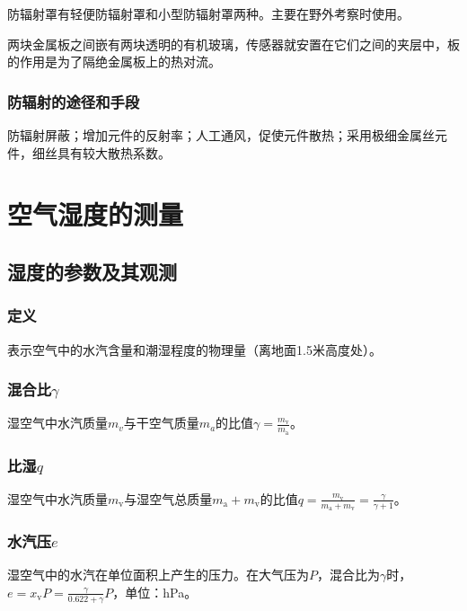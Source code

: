 \documentclass[UTF8,11pt]{ctexbook}
\begin{document}
防辐射罩有轻便防辐射罩和小型防辐射罩两种。主要在野外考察时使用。

两块金属板之间嵌有两块透明的有机玻璃，传感器就安置在它们之间的夹层中，板的作用是为了隔绝金属板上的热对流。

\subsection{防辐射的途径和手段}

防辐射屏蔽；增加元件的反射率；人工通风，促使元件散热；采用极细金属丝元件，细丝具有较大散热系数。

\chapter{空气湿度的测量}

\section{湿度的参数及其观测}

\subsection{定义}

表示空气中的水汽含量和潮湿程度的物理量（离地面1.5米高度处）。

\subsection{混合比\(\gamma\)}

湿空气中水汽质量\(m_v\)与干空气质量\(m_a\)的比值\(\gamma=\frac{m_\mathrm{v}}{m_\mathrm{a}}\)。

\subsection{比湿\(q\)}

湿空气中水汽质量\(m_\mathrm{v}\)与湿空气总质量\(m_\mathrm{a}+m_\mathrm{v}\)的比值\(q=\frac{m_\mathrm{v}}{m_\mathrm{a}+m_\mathrm{v}}=\frac{\gamma}{\gamma+1}\)。	

\subsection{水汽压\(e\)}

湿空气中的水汽在单位面积上产生的压力。在大气压为\(P\)，混合比为\(\gamma\)时，\(e=x_\mathrm{v}P=\frac{\gamma}{0.622+\gamma}P\)，单位：hPa。
\end{document}
